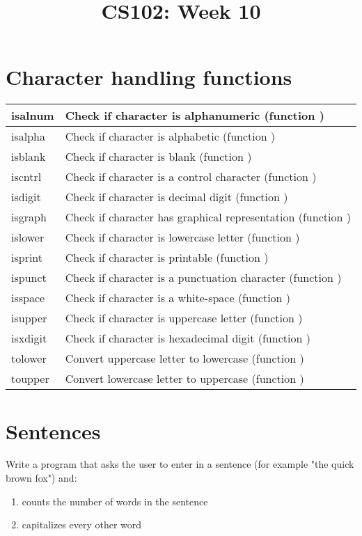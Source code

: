 \documentclass{article}
\begin{document}
\title{CS102: Week 10}

\maketitle
\section*{Character handling functions}
\begin{tabular}{|l|l|}
\hline
isalnum & Check if character is alphanumeric (function )\\ 
 \hline 
isalpha & Check if character is alphabetic (function )\\ 
 \hline 
isblank & Check if character is blank (function )\\ 
 \hline 
iscntrl & Check if character is a control character (function )\\ 
 \hline 
isdigit & Check if character is decimal digit (function )\\ 
 \hline 
isgraph & Check if character has graphical representation (function )\\ 
 \hline 
islower & Check if character is lowercase letter (function )\\ 
 \hline 
isprint & Check if character is printable (function )\\ 
 \hline 
ispunct & Check if character is a punctuation character (function )\\ 
 \hline 
isspace & Check if character is a white-space (function )\\ 
 \hline 
isupper & Check if character is uppercase letter (function )\\ 
 \hline 
isxdigit & Check if character is hexadecimal digit (function )\\ 
 \hline 
tolower & Convert uppercase letter to lowercase (function )\\ 
 \hline 
toupper & Convert lowercase letter to uppercase (function ) \\
\hline
\end{tabular}
\section*{Sentences}
Write a program that asks the user to enter in a sentence (for example "the quick brown fox") and:
\begin{enumerate}
	\item counts the number of words in the sentence
	\item capitalizes every other word
\end{enumerate}
\end{document}
